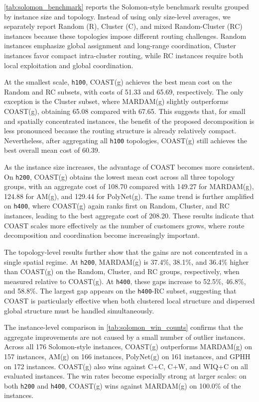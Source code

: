 \documentclass[conference]{IEEEtran}
\begin{document}
\autoref{tab:solomon_benchmark} reports the Solomon-style benchmark results grouped by instance size and topology. Instead of using only size-level averages, we separately report Random (R), Cluster (C), and mixed Random-Cluster (RC) instances because these topologies impose different routing challenges. Random instances emphasize global assignment and long-range coordination, Cluster instances favor compact intra-cluster routing, while RC instances require both local exploitation and global coordination.

At the smallest scale, \texttt{h100}, COAST(g) achieves the best mean cost on the Random and RC subsets, with costs of 51.33 and 65.69, respectively. The only exception is the Cluster subset, where MARDAM(g) slightly outperforms COAST(g), obtaining 65.08 compared with 67.65. This suggests that, for small and spatially concentrated instances, the benefit of the proposed decomposition is less pronounced because the routing structure is already relatively compact. Nevertheless, after aggregating all \texttt{h100} topologies, COAST(g) still achieves the best overall mean cost of 60.39.

As the instance size increases, the advantage of COAST becomes more consistent. On \texttt{h200}, COAST(g) obtains the lowest mean cost across all three topology groups, with an aggregate cost of 108.70 compared with 149.27 for MARDAM(g), 124.88 for AM(g), and 129.44 for PolyNet(g). The same trend is further amplified on \texttt{h400}, where COAST(g) again ranks first on Random, Cluster, and RC instances, leading to the best aggregate cost of 208.20. These results indicate that COAST scales more effectively as the number of customers grows, where route decomposition and coordination become increasingly important.

The topology-level results further show that the gains are not concentrated in a single spatial regime. At \texttt{h200}, MARDAM(g) is 37.4\%, 38.1\%, and 36.4\% higher than COAST(g) on the Random, Cluster, and RC groups, respectively, when measured relative to COAST(g). At \texttt{h400}, these gaps increase to 52.5\%, 46.8\%, and 58.8\%. The largest gap appears on the \texttt{h400}-RC subset, suggesting that COAST is particularly effective when both clustered local structure and dispersed global structure must be handled simultaneously.

The instance-level comparison in \autoref{tab:solomon_win_counts} confirms that the aggregate improvements are not caused by a small number of outlier instances. Across all 176 Solomon-style instances, COAST(g) outperforms MARDAM(g) on 157 instances, AM(g) on 166 instances, PolyNet(g) on 161 instances, and GPHH on 172 instances. COAST(g) also wins against C+C, C+W, and WIQ+C on all evaluated instances. The win rates become especially strong at larger scales: on both \texttt{h200} and \texttt{h400}, COAST(g) wins against MARDAM(g) on 100.0\% of the instances.
\end{document}
